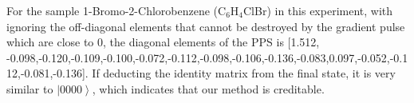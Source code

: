 \documentclass[6pt]{rspublic}
\begin{document}
For the sample 1-Bromo-2-Chlorobenzene (C$_6$H$_4$ClBr) in this experiment, with ignoring the off-diagonal elements that cannot be destroyed by the gradient pulse which are close to 0, the diagonal elements of the PPS is [1.512, -0.098,-0.120,-0.109,-0.100,-0.072,-0.112,-0.098,-0.106,-0.136,-0.083,0.097,-0.052,-0.112,-0.081,-0.136].
If deducting the identity matrix from the final state, it is very similar to $\left\vert 0000 \right\rangle$, which indicates that our method is creditable. 







 
 
\end{document}
